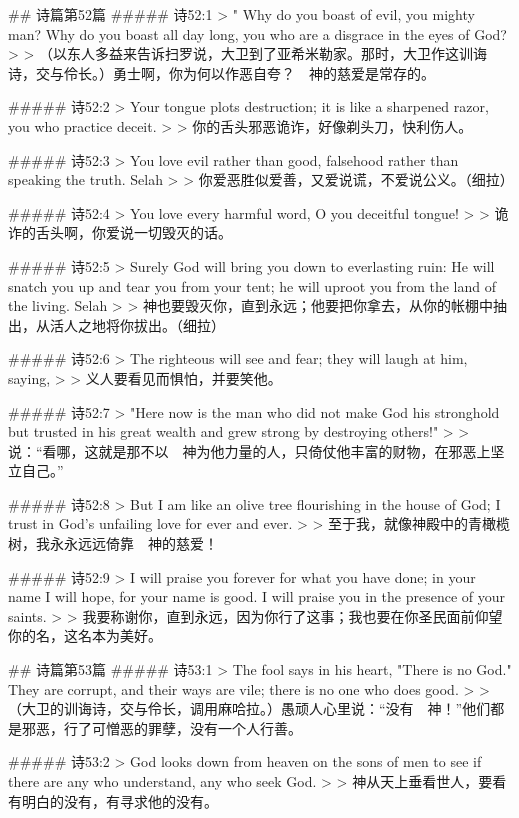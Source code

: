 ## 诗篇第52篇
##### 诗52:1
> " Why do you boast of evil, you mighty man? Why do you boast all day long, you who are a disgrace in the eyes of God?
>
> （以东人多益来告诉扫罗说，大卫到了亚希米勒家。那时，大卫作这训诲诗，交与伶长。）勇士啊，你为何以作恶自夸？　神的慈爱是常存的。


##### 诗52:2
> Your tongue plots destruction; it is like a sharpened razor, you who practice deceit.
>
> 你的舌头邪恶诡诈，好像剃头刀，快利伤人。


##### 诗52:3
> You love evil rather than good, falsehood rather than speaking the truth. Selah
>
> 你爱恶胜似爱善，又爱说谎，不爱说公义。（细拉）


##### 诗52:4
> You love every harmful word, O you deceitful tongue!
>
> 诡诈的舌头啊，你爱说一切毁灭的话。


##### 诗52:5
> Surely God will bring you down to everlasting ruin: He will snatch you up and tear you from your tent; he will uproot you from the land of the living. Selah
>
> 神也要毁灭你，直到永远；他要把你拿去，从你的帐棚中抽出，从活人之地将你拔出。（细拉）


##### 诗52:6
> The righteous will see and fear; they will laugh at him, saying,
>
> 义人要看见而惧怕，并要笑他。


##### 诗52:7
> "Here now is the man who did not make God his stronghold but trusted in his great wealth and grew strong by destroying others!"
>
> 说：“看哪，这就是那不以　神为他力量的人，只倚仗他丰富的财物，在邪恶上坚立自己。”


##### 诗52:8
> But I am like an olive tree flourishing in the house of God; I trust in God's unfailing love for ever and ever.
>
> 至于我，就像神殿中的青橄榄树，我永永远远倚靠　神的慈爱！


##### 诗52:9
> I will praise you forever for what you have done; in your name I will hope, for your name is good. I will praise you in the presence of your saints.
>
> 我要称谢你，直到永远，因为你行了这事；我也要在你圣民面前仰望你的名，这名本为美好。


## 诗篇第53篇
##### 诗53:1
> The fool says in his heart, "There is no God." They are corrupt, and their ways are vile; there is no one who does good.
>
> （大卫的训诲诗，交与伶长，调用麻哈拉。）愚顽人心里说：“没有　神！”他们都是邪恶，行了可憎恶的罪孽，没有一个人行善。


##### 诗53:2
> God looks down from heaven on the sons of men to see if there are any who understand, any who seek God.
>
> 神从天上垂看世人，要看有明白的没有，有寻求他的没有。


